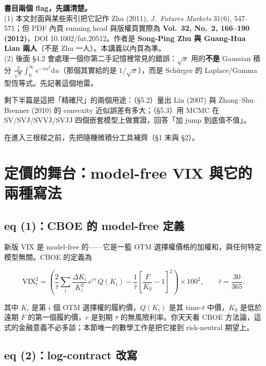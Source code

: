 \documentclass[12pt, a4paper]{article}
\theoremstyle{remark}
\newcommand{\dd}{\mathrm{d}}
\newcommand{\VIX}{\mathrm{VIX}}
\begin{document}
\begin{remarkbox}
\textbf{書目兩個 flag，先講清楚。}\\[2pt]
(1) 本文封面與某些索引把它記作 Zhu (2011), \textit{J.\ Futures Markets} 31(6), 547--571；但 PDF 內頁 running head 與版權頁實際為 \textbf{Vol.\ 32, No.\ 2, 166--190 (2012)}，DOI 10.1002/fut.20512。作者是 \textbf{Song-Ping Zhu 與 Guang-Hua Lian 兩人}（不是 Zhu 一人）。本講義以內頁為準。\\[2pt]
(2) 後面 §4.2 會處理一個你第二手記憶裡常見的錯誤：$\sqrt{x}$ 用的\textbf{不是} Gaussian 積分 $\frac{2}{\sqrt\pi}\int_0^\infty e^{-xu^2}\dd u$（那個其實給的是 $1/\sqrt{x}$），而是 Schürger 的 Laplace/Gamma 型恆等式。先記著這個地雷。
\end{remarkbox}

剩下半篇是這把「精確尺」的兩個用途：（§5.2）量出 Lin (2007) 與 Zhang--Shu--Brenner (2010) 的 convexity 近似誤差有多大；（§5.3）用 MCMC 在 SV/SVJ/SVVJ/SVJJ 四個嵌套模型上做實證，回答「加 jump 到底值不值」。

在進入三根樑之前，先把隨機微積分工具補齊（§1 末與 §2）。

\newpage

\section{定價的舞台：model-free VIX 與它的兩種寫法}

\subsection{eq (1)：CBOE 的 model-free 定義}

新版 VIX 是 model-free 的——它是一籃 OTM 選擇權價格的加權和，與任何特定模型無關。CBOE 的定義為

\begin{equation}
  \VIX_t^2 = \left(\frac{2}{\bar\tau}\sum_i \frac{\Delta K_i}{K_i^2}\,e^{r\bar\tau}\,Q(K_i)
  - \frac{1}{\bar\tau}\!\left[\frac{F}{K_0}-1\right]^2\right)\times 100^2,
  \qquad \bar\tau = \frac{30}{365}.
  \tag{1}
\end{equation}

其中 $K_i$ 是第 $i$ 個 OTM 選擇權的履約價，$Q(K_i)$ 是其 time-$t$ 中價，$K_0$ 是低於遠期 $F$ 的第一個履約價，$r$ 是到期 $\bar\tau$ 的無風險利率。你天天看 CBOE 方法論，這式的金融意義不必多談；本節唯一的數學工作是把它接到 risk-neutral 期望上。

\subsection{eq (2)：log-contract 改寫}
\end{document}
